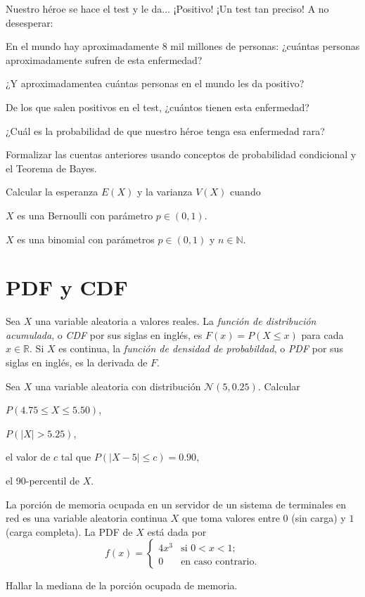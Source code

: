 \documentclass[a4paper,oneside,fleqn,11pt]{article}
\newcommand\RR{\mathbb{R}}
\newcommand\NN{\mathbb{N}}
\newcommand\N{\mathcal{N}}
\begin{document}
\begin{ejercicios}
Nuestro héroe se hace el test y le da... ¡Positivo! ¡Un test tan preciso! A no
desesperar:

\begin{ejitems}
  \item En el mundo hay aproximadamente 8 mil millones de personas: ¿cuántas
  personas aproximadamente sufren de esta enfermedad?  
  \item ¿Y aproximadamentea cuántas personas en el mundo les da positivo?  
  \item De los que salen positivos en el test, ¿cuántos tienen esta enfermedad?
  \item ¿Cuál es la probabilidad de que nuestro héroe tenga esa enfermedad rara?
  \item Formalizar las cuentas anteriores usando conceptos de probabilidad condicional y el Teorema de Bayes.
\end{ejitems}

\item Calcular la esperanza $E(X)$ y la varianza $V(X)$ cuando
\begin{ejitems}
  \item $X$ es una Bernoulli con parámetro $p\in(0,1)$.
  \item $X$ es una binomial con parámetros $p\in(0,1)$ y $n\in\NN$.
\end{ejitems}


\section{PDF y CDF}

Sea $X$ una variable aleatoria a valores reales. La \emph{función de
distribución acumulada}, o \emph{CDF} por sus siglas en inglés, es $F(x) =
P(X\leq x)$ para cada $x\in\RR$.  Si $X$ es continua, la \emph{función de
densidad de probabildad}, o \emph{PDF} por sus siglas en inglés, es la
derivada de $F$.

\item
Sea $X$ una variable aleatoria con distribución $\N(5, 0.25)$. Calcular
\begin{ejitems}
    \item $P(4.75 \leq X \leq 5.50)$,
    \item $P(|X| > 5.25)$,
    \item el valor de $c$ tal que $P(|X - 5| \leq c) = 0.90$,
    \item el 90-percentil de $X$.
\end{ejitems}

\item
La porción de memoria ocupada en un servidor de un sistema de terminales en
red es una variable aleatoria continua $X$ que toma valores entre $0$ (sin
carga) y $1$ (carga completa). La PDF de $X$ está dada por 
\[
  f(x) = 
  \begin{cases}
    4x^3 & \text{si $0 < x < 1$;} \\
    0 & \text{en caso contrario.}
  \end{cases}
\]
\begin{ejitems}
  \item Hallar la mediana de la porción ocupada de memoria.
  

\end{ejitems}
\end{ejercicios}
\end{document}

